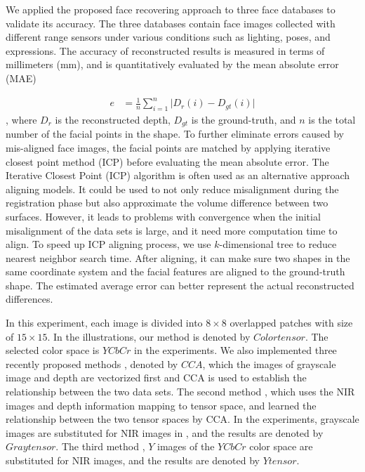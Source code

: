 We applied the proposed face recovering approach to three face databases to validate its accuracy. The three databases contain face images collected with different range sensors under various conditions such as lighting, poses, and expressions. The accuracy of reconstructed results is measured in terms of millimeters (mm), and is quantitatively evaluated by the mean absolute error (MAE)

\begin{align}
  e &= \frac{1}{n}\sum ^{n}_{i=1}\lvert D_r(i) - D_{gt}(i)\rvert
\end{align} 
, where $D_r$ is the reconstructed depth, $D_{gt}$ is the ground-truth, and $n$ is the total number of the facial points in the shape. 
To further eliminate errors caused by mis-aligned face images, the facial points are matched by applying iterative closest point method (ICP) \cite{besl1992method} before evaluating the mean absolute error. 
The Iterative Closest Point (ICP) algorithm is often used as an alternative approach aligning models. 
It could be used to not only reduce misalignment during the registration phase but also approximate the volume difference between two surfaces. 
However, it leads to problems with convergence when the initial misalignment of the data sets is large, and it need more computation time to align. 
To speed up ICP aligning process, we use $k$-dimensional tree to reduce nearest neighbor search time. 
After aligning, it can make sure two shapes in the same coordinate system and the facial features are aligned to the ground-truth shape. 
The estimated average error can better represent the actual reconstructed differences.

In this experiment, each image is divided into $8 \times 8$ overlapped patches with size of $15 \times 15$.
In the illustrations, our method is denoted by $Colortensor$. 
The selected color space is $YCbCr$ in the experiments. 
We also implemented three recently proposed methods \cite{reiter20063d}, denoted by $CCA$, which the images of grayscale image and depth are vectorized first and CCA is used to establish the relationship between the two data sets. 
The second method \cite{lei2008face}, which uses the NIR images and depth information mapping to tensor space, and learned the relationship between the two tensor spaces by CCA. 
In the experiments, grayscale images are substituted for NIR images in \cite{lei2008face}, and the results are denoted by $Graytensor$.
The third method \cite{lei2008face}, $Y$ images of the $YCbCr$ color space are substituted for NIR images, and the results are denoted by $Ytensor$.

